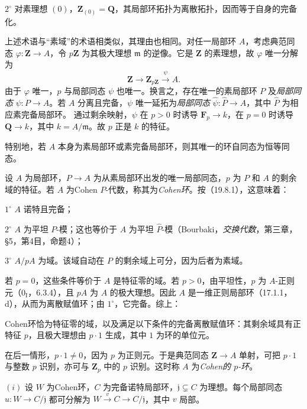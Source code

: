$2^\circ$ 对素理想 $(0)$，$\mathbf Z_{(0)}=\mathbf Q$，其局部环拓扑为离散拓扑，因而等于自身的完备化。

上述术语与“素域”的术语相类似，其理由也相同。对任一局部环 $A$，考虑典范同态 $\varphi:\mathbf Z\to A$，令 $p\mathbf Z$ 为其极大理想 $\mathfrak m$ 的逆像。它是 $\mathbf Z$ 的素理想，故 $\varphi$ 唯一分解为
\[
 \mathbf Z\longrightarrow\mathbf Z_{p\mathbf Z}\xrightarrow{\psi}A.
\]
由于 $\varphi$ 唯一，$p$ 与局部同态 $\psi$ 也唯一。换言之，存在唯一的素局部环 $P$ 及\emph{局部同态} $\psi:P\to A$。若 $A$ 分离且完备，$\psi$ 唯一延拓为\emph{局部同态} $\widehat\psi:\widehat P\to A$，其中 $\widehat P$ 为相应素完备局部环。
通过剩余映射，$\psi$ 在 $p>0$ 时诱导 $\mathbf F_p\to k$，在 $p=0$ 时诱导 $\mathbf Q\to k$，其中 $k=A/\mathfrak m$。故 $p$ 正是 $k$ 的特征。

特别地，若 $A$ 本身为素局部环或素完备局部环，则其唯一的环自同态为恒等同态。

设 $A$ 为局部环，$P\to A$ 为从素局部环出发的唯一局部同态，$p$ 为 $P$ 和 $A$ 的剩余域的特征。若 $A$ 为Cohen $P$-代数，称其为\emph{Cohen环}。按（19.8.1），这意味着：

$1^\circ$ $A$ 诺特且完备；

$2^\circ$ $A$ 为平坦 $P$-模；这也等价于 $A$ 为平坦 $\widehat P$-模（Bourbaki，\textit{交换代数}，第三章，§5，第4目，命题4）；

$3^\circ$ $A/pA$ 为域。该域自动在 $P$ 的剩余域上可分，因为后者为素域。

若 $p=0$，这些条件等价于 $A$ 是特征零的域。若 $p>0$，由平坦性，$p$ 为 $A$-正则元（$0_{\mathrm I}$，6.3.4），且 $pA$ 为 $A$ 的极大理想。因此 $A$ 是一维正则局部环（17.1.1，d），从而为离散赋值环；由 $1^\circ$，它完备。综上：

Cohen环恰为特征零的域，以及满足以下条件的完备离散赋值环：其剩余域具有正特征 $p$，且极大理想由 $p\cdot1$ 生成，其中 $1$ 为环的单位元。

在后一情形，$p\cdot1\ne0$，因为 $p$ 为正则元。于是典范同态 $\mathbf Z\to A$ 单射，可把 $p\cdot1$ 与整数 $p$ 识别，亦可与 $\mathbf Z_p$ 中的 $p$ 识别。这时称 $A$ 为\emph{Cohen的 $p$-环}。

$(i)$ 设 $W$ 为Cohen环，$C$ 为完备诺特局部环，$\mathfrak j\subsetneq C$ 为理想。每个局部同态 $u:W\to C/\mathfrak j$ 都可分解为 $W\xrightarrow{v}C\to C/\mathfrak j$，其中 $v$ 局部。

